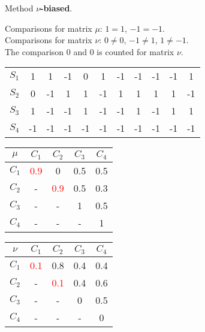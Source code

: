 \documentclass{beamer}
\begin{document}
\begin{frame}
Method \textbf{$\nu$-biased}.

\bigskip
Comparisons for matrix $\mu$: $1=1$, $-1=-1$.\\
Comparisons for matrix $\nu$: $0\neq0$, $-1\neq1$, $1\neq-1$.\\
The comparison $0$ and $0$ is counted for matrix $\nu$.

\begin{center}
\begin{tabular}{c|cccccccccc}
& & & & & & & & & & \\
\hline $S_1$ & 1 & 1 & -1 & 0 & 1 & -1 & -1 & -1 & -1 & 1 \\
$S_2$ & 0 & -1 & 1 & 1 & -1 & 1 & 1 & 1 & 1 & -1 \\
$S_3$ & 1 & -1 & -1 & 1 & -1 & -1 & 1 & -1 & 1 & 1 \\
$S_4$ & -1 & -1 & -1 & -1 & -1 & -1 & -1 & -1 & -1 & -1
\end{tabular}
\end{center}

\begin{center}
\begin{minipage}[b]{0.4\linewidth}
\begin{tabular}{c|cccc}
$\mu$ & $C_1$ & $C_2$ & $C_3$ & $C_4$ \\
\hline $C_1$ & \textcolor{red}{0.9} & 0 & 0.5 & 0.5 \\
$C_2$ & - & \textcolor{red}{0.9} & 0.5 & 0.3 \\
$C_3$ & - & - & 1 & 0.5 \\
$C_4$ & - & - & - & 1
\end{tabular}
\end{minipage}
\begin{minipage}[b]{0.4\linewidth}
\begin{tabular}{c|cccc}
$\nu$ & $C_1$ & $C_2$ & $C_3$ & $C_4$ \\
\hline $C_1$ & \textcolor{red}{0.1} & 0.8 & 0.4 & 0.4 \\
$C_2$ & - & \textcolor{red}{0.1} & 0.4 & 0.6 \\
$C_3$ & - & - & 0 & 0.5 \\
$C_4$ & - & - & - & 0
\end{tabular}
\end{minipage}
\end{center}
\end{frame}
\end{document}
